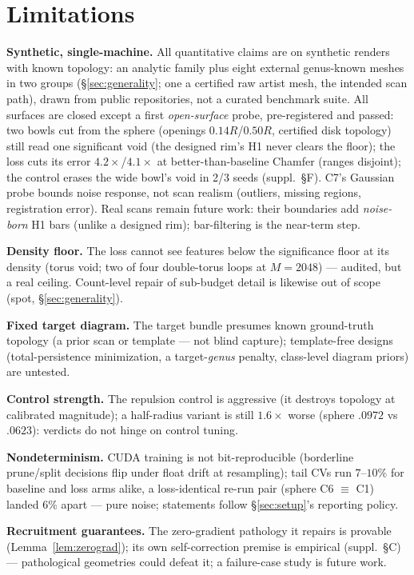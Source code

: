 \section{Limitations}
\label{sec:limitations}


\textbf{Synthetic, single-machine.} All quantitative claims are on
synthetic renders with known topology: an
analytic family plus eight external genus-known meshes in two groups
(\S\ref{sec:generality}; one a certified raw artist mesh, the intended
scan path), drawn from public repositories, not a curated benchmark
suite. All surfaces
are closed except a first \emph{open-surface} probe, pre-registered
and passed: two bowls cut from the sphere (openings $0.14R$/$0.50R$,
certified disk topology) still read one significant void (the designed
rim's H1 never clears the floor); the loss cuts its error
$4.2\times$/$4.1\times$ at better-than-baseline Chamfer (ranges
disjoint); the control erases the wide bowl's void in 2/3 seeds
(suppl.\ \S F).
C7's Gaussian probe bounds noise
response, not scan realism (outliers, missing regions, registration
error). Real scans remain future work: their boundaries add
\emph{noise-born} H1 bars (unlike a designed rim); bar-filtering is the
near-term step.

\textbf{Density floor.} The loss cannot see features below the
significance floor at its density (torus void; two of four double-torus
loops at $M{=}2048$) --- audited, but a real ceiling. Count-level repair
of sub-budget detail is likewise out of scope (spot,
\S\ref{sec:generality}).

\textbf{Fixed target diagram.} The target bundle presumes known ground-truth
topology (a prior scan or template --- not blind capture); template-free
designs (total-persistence minimization, a target-\emph{genus} penalty,
class-level diagram priors) are untested.

\textbf{Control strength.} The repulsion control is aggressive (it
destroys topology at calibrated magnitude); a half-radius variant is
still $1.6\times$ worse (sphere $.0972$ vs $.0623$): verdicts do not
hinge on control tuning.

\textbf{Nondeterminism.} CUDA training is not bit-reproducible
(borderline prune/split decisions flip under float drift at
resampling); tail CVs run $7$--$10\%$ for baseline and loss arms alike,
a loss-identical re-run pair (sphere C6 $\equiv$ C1) landed $6\%$ apart
--- pure noise; statements follow \S\ref{sec:setup}'s reporting policy.

\textbf{Recruitment guarantees.} The zero-gradient pathology it repairs
is provable (Lemma~\ref{lem:zerograd}); its own self-correction premise
is empirical (suppl.\ \S C) --- pathological geometries could defeat
it; a failure-case study is future work.
